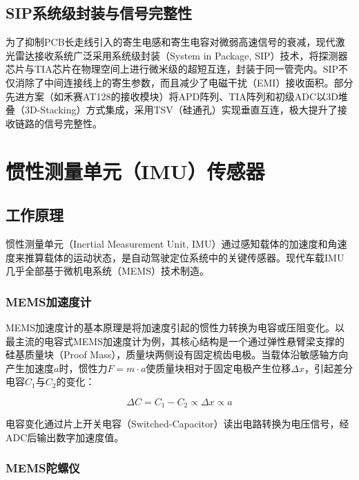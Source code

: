 \documentclass[12pt,a4paper,openany,UTF8]{ctexbook}
\begin{document}
\section{SIP系统级封装与信号完整性}

为了抑制PCB长走线引入的寄生电感和寄生电容对微弱高速信号的衰减，现代激光雷达接收系统广泛采用系统级封装（System in Package, SIP）技术，将探测器芯片与TIA芯片在物理空间上进行微米级的超短互连，封装于同一管壳内。SIP不仅消除了中间连接线上的寄生参数，而且减少了电磁干扰（EMI）接收面积。部分先进方案（如禾赛AT128的接收模块）将APD阵列、TIA阵列和初级ADC以3D堆叠（3D-Stacking）方式集成，采用TSV（硅通孔）实现垂直互连，极大提升了接收链路的信号完整性。

\clearpage

\chapter{惯性测量单元（IMU）传感器}

\section{工作原理}

惯性测量单元（Inertial Measurement Unit, IMU）通过感知载体的加速度和角速度来推算载体的运动状态，是自动驾驶定位系统中的关键传感器。现代车载IMU几乎全部基于微机电系统（MEMS）技术制造。

\subsection{MEMS加速度计}

MEMS加速度计的基本原理是将加速度引起的惯性力转换为电容或压阻变化。以最主流的电容式MEMS加速度计为例，其核心结构是一个通过弹性悬臂梁支撑的硅基质量块（Proof Mass），质量块两侧设有固定梳齿电极。当载体沿敏感轴方向产生加速度$a$时，惯性力$F = m \cdot a$使质量块相对于固定电极产生位移$\Delta x$，引起差分电容$C_1$与$C_2$的变化：

\begin{equation}\label{eq:accel_cap}
\Delta C = C_1 - C_2 \propto \Delta x \propto a
\end{equation}

电容变化通过片上开关电容（Switched-Capacitor）读出电路转换为电压信号，经ADC后输出数字加速度值。

\subsection{MEMS陀螺仪}
\end{document}
